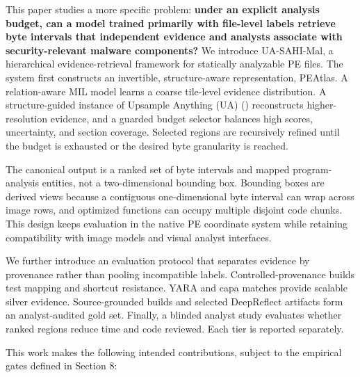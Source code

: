 \documentclass[
  10pt,
]{article}
\begin{document}
This paper studies a more specific problem: \textbf{under an explicit
analysis budget, can a model trained primarily with file-level labels
retrieve byte intervals that independent evidence and analysts associate
with security-relevant malware components?} We introduce UA-SAHI-Mal, a
hierarchical evidence-retrieval framework for statically analyzable PE
files. The system first constructs an invertible, structure-aware
representation, PEAtlas. A relation-aware MIL model learns a coarse
tile-level evidence distribution. A structure-guided instance of
Upsample Anything (UA) () reconstructs higher-resolution evidence, and a guarded
budget selector balances high scores, uncertainty, and section coverage.
Selected regions are recursively refined until the budget is exhausted
or the desired byte granularity is reached.

The canonical output is a ranked set of byte intervals and mapped
program-analysis entities, not a two-dimensional bounding box. Bounding
boxes are derived views because a contiguous one-dimensional byte
interval can wrap across image rows, and optimized functions can occupy
multiple disjoint code chunks. This design keeps evaluation in the
native PE coordinate system while retaining compatibility with image
models and visual analyst interfaces.

We further introduce an evaluation protocol that separates evidence by
provenance rather than pooling incompatible labels.
Controlled-provenance builds test mapping and shortcut resistance. YARA
and capa matches provide scalable silver evidence. Source-grounded
builds and selected DeepReflect artifacts form an analyst-audited gold
set. Finally, a blinded analyst study evaluates whether ranked regions
reduce time and code reviewed. Each tier is reported separately.

This work makes the following intended contributions, subject to the
empirical gates defined in Section 8:
\end{document}
